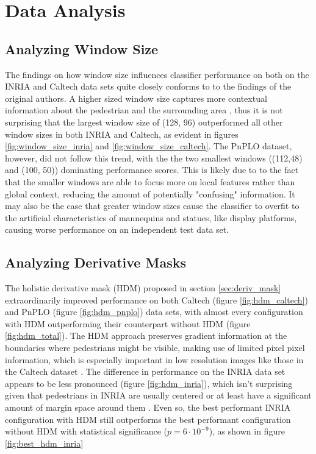 \section{Data Analysis}
\subsection{Analyzing Window Size}

The findings on how window size influences classifier performance on both on the INRIA and Caltech data sets quite closely conforms to to the findings of the original authors. A higher sized window size captures more contextual information about the pedestrian and the surrounding area \cite{dalal_2005_histograms}, thus it is not surprising that the largest window size of (128, 96) outperformed all other window sizes in both INRIA and Caltech, as evident in figures \ref{fig:window_size_inria} and \ref{fig:window_size_caltech}. The PnPLO dataset, however, did not follow this trend, with the the two smallest windows ((112,48) and (100, 50)) dominating performance scores. This is likely due to to the fact that the smaller windows are able to focus more on local features rather than global context, reducing the amount of potentially "confusing" information. It may also be the case that greater window sizes cause the classifier to overfit to the artificial characteristics of mannequins and statues, like display platforms, causing worse performance on an independent test data set.



\subsection{Analyzing Derivative Masks}

The holistic derivative mask (HDM) proposed in section \ref{sec:deriv_mask} extraordinarily improved performance on both Caltech (figure \ref{fig:hdm_caltech}) and PnPLO (figure \ref{fig:hdm_pnplo}) data sets, with almost every configuration with HDM outperforming their counterpart without HDM (figure \ref{fig:hdm_total}). The HDM approach preserves gradient information at the boundaries where pedestrians might be visible, making use of limited pixel pixel information, which is especially important in low resolution images like those in the Caltech dataset \cite{dollar_2009_pedestrian}. The difference in performance on the INRIA data set appears to be less pronounced (figure \ref{fig:hdm_inria}), which isn't surprising given that pedestrians in INRIA are usually centered or at least have a significant amount of margin space around them \cite{dalal_2005_histograms}. Even so, the best performant INRIA configuration with HDM still outperforms the best performant configuration without HDM with statistical significance ($p=6\cdot 10^{-9}$), as shown in figure \ref{fig:best_hdm_inria}

